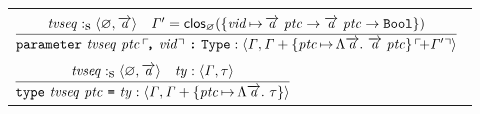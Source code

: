 \documentclass[final]{article}
\begin{document}
\begin{figure}[t]
\begin{small}
\begin{center}
\begin{tabular}{llll}
    \\
    &&&
    \\

    \multicolumn{4}{l}{
      $\MEMinferc
      {\MEMtyping
        {\CONSparameterOpeq{\METAtypvarseq}{\METAtycon}{\METAvid}}
        {\METAityenv}
        {\MEMplusopenv
            {\MEMplusenv
              {\METAityenv}
              {\{\asgn
                {\METAtycon}
                {\CONSityfun
                  {\METAtyvarseq}
                  {\CONSconsty{\METAtyvarseq}{\METAtycon}}
                }\}
              }
            }
            {\METAityenv'}
        }
      }
      {\MEMtypingseq{\METAtypvarseq}{\CONSemptyityenv}{\METAtyvarseq}}
      {
        \METAityenv'
        =
        \MEMclos
            {\CONSemptyityenv}
            {\{\asgn
              {\METAvid}
              {\CONSarrowty
                {\CONSconsty{\METAtyvarseq}{\METAtycon}}
                {\CONSarrowty
                  {\CONSconsty{\METAtyvarseq}{\METAtycon}}
                  {\CONSboolty}
                }
              }\}
            }
      }$
    }





    \\
    &&&
    \\

    \multicolumn{4}{l}{
      $\MEMinferc
      {\MEMtyping
        {\CONStypefundec{\METAtypvarseq}{\METAtycon}{\METAty}}
        {\METAityenv}
        {\MEMplusenv
          {\METAityenv}
          {\{\asgn
            {\METAtycon}
            {\CONSityfun
              {\METAtyvarseq}
              {\METAity}
            }\}
          }
        }
      }
      {\MEMtypingseq{\METAtypvarseq}{\CONSemptyityenv}{\METAtyvarseq}}
      {\MEMtyping{\METAty}{\METAityenv}{\METAity}}$
    }


\end{tabular}
\end{center}
\end{small}
\end{figure}
\end{document}
